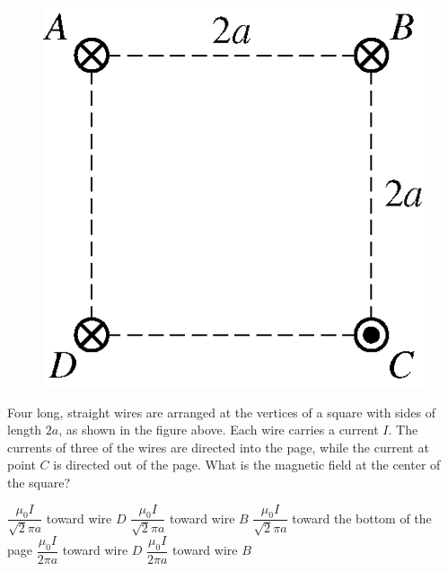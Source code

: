 \begin{figure}[H]
\centering
\includegraphics[scale=0.3]{images/img-012-038.png}
\end{figure}

\begin{questions}\setcounter{question}{28}\question
Four long, straight wires are arranged at the vertices of a square with sides of length $2 a$, as shown in the figure above. Each wire carries a current $I$. The currents of three of the wires are directed into the page, while the current at point $C$ is directed out of the page. What is the magnetic field at the center of the square?

\begin{choices}
\choice $\dfrac{\mu_{0} I}{\sqrt{2} \pi a}$ toward wire $D$
\choice $\dfrac{\mu_{0} I}{\sqrt{2} \pi a}$ toward wire $B$
\choice $\dfrac{\mu_{0} I}{\sqrt{2} \pi a}$ toward the bottom of the page
\choice $\dfrac{\mu_{0} I}{2 \pi a}$ toward wire $D$
\choice $\dfrac{\mu_{0} I}{2 \pi a}$ toward wire $B$
\end{choices}\end{questions}


